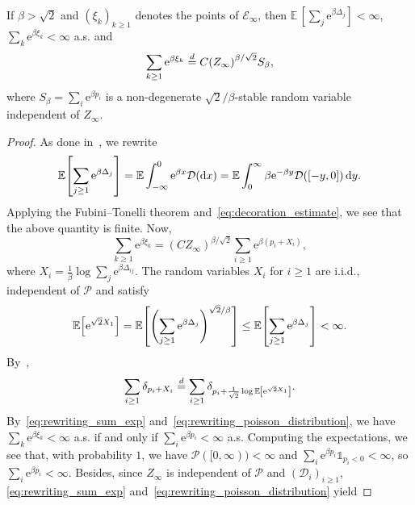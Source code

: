 \documentclass[AHL,Unicode,longabstracts,published]{cedram}
\newcommand{\e}{\mathrm{e}}
\renewcommand{\d}[1]{\mathop{}\!\mathrm{d}#1}
\newcommand{\E}{\mathbb{E}}
\newcommand\1{\mathds{1}}
\newcommand{\cD}{\mathcal{D}}
\newcommand{\cE}{\mathcal{E}}
\newcommand{\cP}{\mathcal{P}}
\newcommand{\Expec}[1]{\mathbb{E}\left[#1\right]}
\let\originalleft\left
\let\originalright\right
\renewcommand{\left}{\mathopen{}\mathclose\bgroup\originalleft}
\renewcommand{\right}{\aftergroup\egroup\originalright}
\begin{document}
\begin{lemm}\label{lem:sum_gibbs_weights_ppp}
If $\beta > \sqrt{2}$ and $(\xi_k)_{k\geq1}$ denotes the points of $\cE_\infty$, then $\E\,[\sum_j \e^{\beta \Delta_j}] < \infty$, $\sum_k \e^{\beta \xi_k} < \infty$ a.s. and
\begin{equation}\label{eq:rewriting_sum_ppp}
\sum_{k \geq 1} \e^{\beta \xi_k} \overset{d}{=} C \left(Z_\infty\right)^{\beta/\sqrt{2}} S_\beta,
\end{equation}
where $S_\beta = \sum_i \e^{\beta p_i}$ is a non-degenerate $\sqrt{2}/\beta$-stable random variable independent of $Z_\infty$.
\end{lemm}

\begin{proof}
As done in~\cite[Lemma~3.1]{Bonnefont2022}, we rewrite
\begin{equation*}
\Expec{\sum_{j \geq 1} \e^{\beta \Delta_j}} = \E \int_{-\infty}^0 \e^{\beta x} \cD(\d{x}) = \E \int_0^\infty \beta \e^{-\beta y} \cD([-y, 0]) \d{y}.
\end{equation*}
Applying the Fubini--Tonelli theorem and~\eqref{eq:decoration_estimate}, we see that the above quantity is finite. Now,
\begin{equation}\label{eq:rewriting_sum_exp}
\sum_{k \geq 1} \e^{\beta \xi_k} = (C Z_\infty)^{\beta/\sqrt{2}} \sum_{i \geq 1} \e^{\beta(p_i + X_i)},
\end{equation}
where $X_i = \frac{1}{\beta} \log \sum_j \e^{\beta \Delta_{ij}}$. The random variables $X_i$ for $i \geq 1$ are i.i.d., independent of $\cP$ and satisfy
\begin{equation*}
\Expec{\e^{\sqrt{2} X_1}} = \Expec{\Biggl(\sum_{j \geq 1} \e^{\beta \Delta_j}\Biggr)^{\sqrt{2}/\beta}} \leq \Expec{\sum_{j \geq 1} \e^{\beta \Delta_j}} < \infty.
\end{equation*}
By~\cite[Proposition~8.7.a]{BolthausenSznitman2002},
\begin{equation}\label{eq:rewriting_poisson_distribution}
\sum_{i \geq 1} \delta_{p_i + X_i} \overset{d}{=} \sum_{i \geq 1} \delta_{p_i + \frac{1}{\sqrt{2}} \log \Expec{\e^{\sqrt{2} X_1}}}.
\end{equation}
By~\eqref{eq:rewriting_sum_exp} and~\eqref{eq:rewriting_poisson_distribution}, we have $\sum_k \e^{\beta \xi_k} < \infty$ a.s. if and only if $\sum_i \e^{\beta p_i} < \infty$ a.s. Computing the expectations, we see that, with probability $1$, we have $\cP([0, \infty)) < \infty$ and $\sum_i \e^{\beta p_i} \1_{p_i < 0} < \infty$, so $\sum_i \e^{\beta p_i} < \infty$. Besides, since $Z_\infty$ is independent of $\cP$ and $(\cD_i)_{i \geq 1}$, \eqref{eq:rewriting_sum_exp} and~\eqref{eq:rewriting_poisson_distribution} yield

\end{proof}
\end{document}
